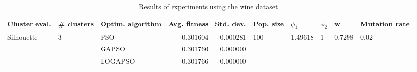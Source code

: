 \begin{table}
\centering
\caption{Results of experiments using the wine dataset}
\begin{tabular}{lllrrlllll}
\toprule
              Cluster eval. &        \# clusters & Optim. algorithm &  Avg. fitness &  Std. dev. &            Pop. size &               $\phi_{1}$ &         $\phi_{2}$ &                       w &         Mutation rate \\
\midrule
\multirow{3}{*}{Silhouette} & \multirow{3}{*}{3} &              PSO &      0.301604 &   0.000281 & \multirow{3}{*}{100} & \multirow{3}{*}{1.49618} & \multirow{3}{*}{1} & \multirow{3}{*}{0.7298} & \multirow{3}{*}{0.02} \\
                            &                    &            GAPSO &      0.301766 &   0.000000 &                      &                          &                    &                         &                       \\
                            &                    &          LOGAPSO &      0.301766 &   0.000000 &                      &                          &                    &                         &                       \\
\bottomrule
\end{tabular}
\end{table}
